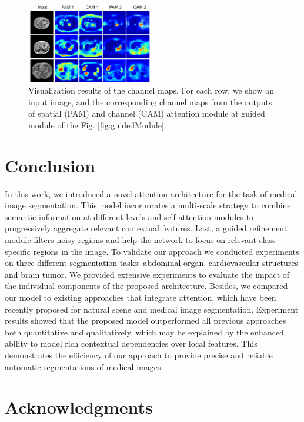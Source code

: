 \documentclass[journal]{IEEEtran}
\begin{document}
\begin{figure}[h!]
    \centering
    \includegraphics[width=0.5\textwidth]{AttentionMaps_Red.png}
    \caption{Visualization results of the channel maps. For each row, we show an input image, and the corresponding channel maps from the outputs of spatial (PAM) and channel (CAM) attention module at guided module of the Fig. \ref{fig:guidedModule}.}
    \label{fig:attmaps}
\end{figure}

\section{Conclusion}

In this work, we introduced a novel attention architecture for the task of medical image segmentation. This model incorporates a multi-scale strategy to combine semantic information at different levels and self-attention modules to progressively aggregate relevant contextual features. Last, a guided refinement module filters noisy regions and help the network to focus on relevant class-specific regions in the image. To validate our approach we conducted experiments on \textcolor{black}{ three different segmentation tasks: abdominal organ, cardiovascular structures and brain tumor.} We provided extensive experiments to evaluate the impact of the individual components of the proposed architecture. Besides, we compared our model to existing approaches that integrate attention, which have been recently proposed for natural scene \cite{fu2018dual,li2018pyramid} and medical image \cite{ronneberger2015u,wang18d,schlemper2019attention} segmentation. Experiment results showed that the proposed model outperformed all previous approaches both quantitative and qualitatively, which may be explained by the enhanced ability to model rich contextual dependencies over local features. This demonstrates the efficiency of our approach to provide precise and reliable automatic segmentations of medical images.


\section*{Acknowledgments}
\end{document}
